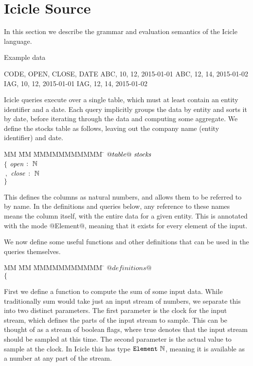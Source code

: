 \section{Icicle Source}
\label{s:Source}

In this section we describe the grammar and evaluation semantics of the Icicle language.

Example data
\begin{code}
CODE, OPEN, CLOSE, DATE
ABC,    10,    12, 2015-01-01
ABC,    12,    14, 2015-01-02
IAG,    10,    12, 2015-01-01
IAG,    12,    14, 2015-01-02
\end{code}

Icicle queries execute over a single table, which must at least contain an entity identifier and a date.
Each query implicitly groups the data by entity and sorts it by date, before iterating through the data and computing some aggregate.
We define the stocks table as follows, leaving out the company name (entity identifier) and date.

\begin{tabbing}
MM \= MM \= MMMMMMMMMMM \= \kill
$@table@~\mathit{stocks}$    \\
$\{$ \> $\mathit{open}$ \> $:~\mathbb{N}$ \\
$~,$ \> $\mathit{close}$ \> $:~\mathbb{N}$ \\
$\}$
\end{tabbing}

This defines the columns as natural numbers, and allows them to be referred to by name.
In the definitions and queries below, any reference to these names means the column itself, with the entire data for a given entity.
This is annotated with the mode @Element@, meaning that it exists for every element of the input.

We now define some useful functions and other definitions that can be used in the queries themselves.

\begin{tabbing}
MM \= MM \= MMMMMMMMMMM \= \kill
$@definitions@$ \\
$\{$
\end{tabbing}

First we define a function to compute the sum of some input data.
While traditionally sum would take just an input stream of numbers, we separate this into two distinct parameters.
The first parameter is the clock for the input stream, which defines the parts of the input stream to sample.
This can be thought of as a stream of boolean flags, where true denotes that the input stream should be sampled at this time.
The second parameter is the actual value to sample at the clock.
In Icicle this has type $\mathtt{Element}~\mathbb{N}$, meaning it is available as a number at any part of the stream.

